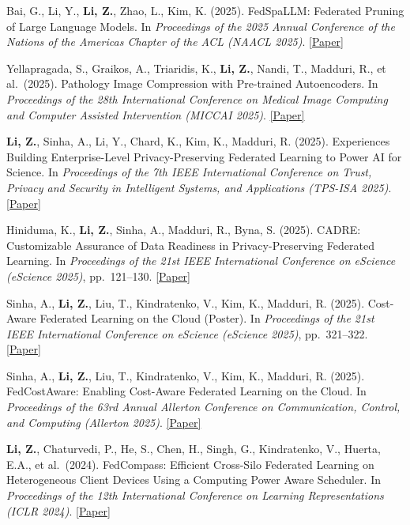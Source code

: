 \documentclass[letterpaper,11pt]{article}
\begin{document}
\begin{enumerate}[leftmargin=1cm, label={[\arabic*]}, itemsep=3pt]
  \item Bai, G., Li, Y., \textbf{Li, Z.}, Zhao, L., Kim, K. (2025). FedSpaLLM: Federated Pruning of Large Language Models. In \textit{Proceedings of the 2025 Annual Conference of the Nations of the Americas Chapter of the ACL (NAACL 2025)}. \href{https://arxiv.org/abs/2410.14852}{[Paper]}

  \item Yellapragada, S., Graikos, A., Triaridis, K., \textbf{Li, Z.}, Nandi, T., Madduri, R., et al.\ (2025). Pathology Image Compression with Pre-trained Autoencoders. In \textit{Proceedings of the 28th International Conference on Medical Image Computing and Computer Assisted Intervention (MICCAI 2025)}. \href{https://arxiv.org/abs/2503.11591}{[Paper]}

  \item \textbf{Li, Z.}, Sinha, A., Li, Y., Chard, K., Kim, K., Madduri, R. (2025). Experiences Building Enterprise-Level Privacy-Preserving Federated Learning to Power AI for Science. In \textit{Proceedings of the 7th IEEE International Conference on Trust, Privacy and Security in Intelligent Systems, and Applications (TPS-ISA 2025)}. \href{https://arxiv.org/abs/2511.08998}{[Paper]}

  \item Hiniduma, K., \textbf{Li, Z.}, Sinha, A., Madduri, R., Byna, S. (2025). CADRE: Customizable Assurance of Data Readiness in Privacy-Preserving Federated Learning. In \textit{Proceedings of the 21st IEEE International Conference on eScience (eScience 2025)}, pp.\ 121--130. \href{https://doi.org/10.1109/eScience65000.2025.00023}{[Paper]}

  \item Sinha, A., \textbf{Li, Z.}, Liu, T., Kindratenko, V., Kim, K., Madduri, R. (2025). Cost-Aware Federated Learning on the Cloud (Poster). In \textit{Proceedings of the 21st IEEE International Conference on eScience (eScience 2025)}, pp.\ 321--322. \href{https://arxiv.org/abs/2505.21727}{[Paper]}

  \item Sinha, A., \textbf{Li, Z.}, Liu, T., Kindratenko, V., Kim, K., Madduri, R. (2025). FedCostAware: Enabling Cost-Aware Federated Learning on the Cloud. In \textit{Proceedings of the 63rd Annual Allerton Conference on Communication, Control, and Computing (Allerton 2025)}. \href{https://arxiv.org/abs/2505.21727}{[Paper]}


  \item \textbf{Li, Z.}, Chaturvedi, P., He, S., Chen, H., Singh, G., Kindratenko, V., Huerta, E.A., et al.\ (2024). FedCompass: Efficient Cross-Silo Federated Learning on Heterogeneous Client Devices Using a Computing Power Aware Scheduler. In \textit{Proceedings of the 12th International Conference on Learning Representations (ICLR 2024)}. \href{https://openreview.net/forum?id=msXxrttLOi}{[Paper]}


\end{enumerate}
\end{document}
